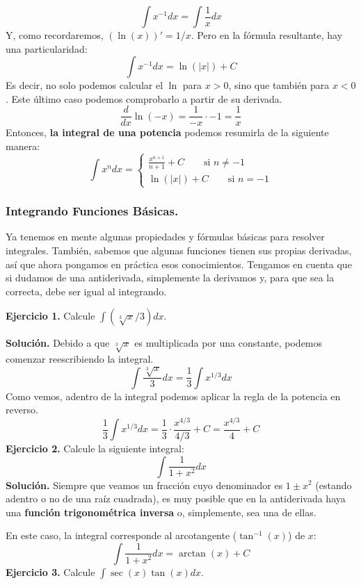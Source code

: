 \documentclass[12pt]{article}
\begin{document}
\[
  \int x^{-1} dx = \int \frac{1}{x} dx
\]
Y, como recordaremos, $(\ln(x))' = 1/x$. Pero en la fórmula resultante, hay una particularidad:
\[
  \int x^{-1} dx = \ln(\lvert x \rvert) + C
\]
Es decir, no solo podemos calcular el $\ln$ para $x > 0$, sino que también para $x < 0$. Este último caso podemos comprobarlo a partir de su derivada.
\[
  \frac{d}{dx} \ln(-x) = \frac{1}{-x} \cdot -1 = \frac{1}{x}
\]
Entonces, \textbf{la integral de una potencia} podemos resumirla de la siguiente manera:
\[
\int x^{n} dx =
  \left\{
    \begin{aligned}
    \frac{x^{n + 1}}{n + 1} + C \qquad \text{si } n \neq -1 \\
    \ln(\lvert x \rvert) + C \qquad \text{si } n = -1
    \end{aligned}
  \right.
\]

\subsubsection{Integrando Funciones Básicas.}

Ya tenemos en mente algunas propiedades y fórmulas básicas para resolver integrales. También, sabemos que algunas funciones tienen sus propias derivadas, así que ahora pongamos en práctica esos conocimientos. Tengamos en cuenta que si dudamos de una antiderivada, simplemente la derivamos y, para que sea la correcta, debe ser igual al integrando.

\textbf{Ejercicio 1.} \quad Calcule $\int (\sqrt[3]{x}/3) dx$.

\textbf{Solución.} \quad Debido a que $\sqrt[3]{x}$ es multiplicada por una constante, podemos comenzar reescribiendo la integral.
\[
  \int \frac{\sqrt[3]{x}}{3} dx = \frac{1}{3} \int x^{1/3} dx
\]
Como vemos, adentro de la integral podemos aplicar la regla de la potencia en reverso.
\[
  \frac{1}{3} \int x^{1/3} dx = \frac{1}{3} \cdot \frac{x^{4/3}}{4/3} + C
                              = \frac{x^{4/3}}{4} + C
\]
\textbf{Ejercicio 2.} \quad Calcule la siguiente integral:
\[
  \int \frac{1}{1 + x^{2}} dx
\]
\textbf{Solución.} \quad Siempre que veamos un fracción cuyo denominador es $1 \pm x^{2}$ (estando adentro o no de una raíz cuadrada), es muy posible que en la antiderivada haya una \textbf{función trigonométrica inversa} o, simplemente, sea una de ellas.

En este caso, la integral corresponde al arcotangente ($\tan^{-1}(x)$) de $x$:
\[
  \int \frac{1}{1 + x^{2}} dx = \arctan(x) + C
\]
\textbf{Ejercicio 3.} \quad Calcule $\int \sec(x) \tan(x) dx$.
\end{document}
